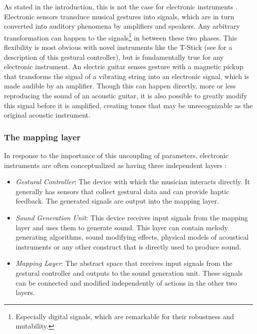 As stated in the introduction, this is not the case for electronic instruments . Electronic sensors transduce musical gestures into signals, which are in turn converted into auditory phenomena by amplifiers and speakers. Any arbitrary transformation can happen to the signals\footnote{Especially digital signals, which are remarkable for their robustness and mutability.} in between these two phases. This flexibility is most obvious with novel instruments like the T-Stick (see  for a description of this gestural controller), but is fundamentally true for any electronic instrument. An electric guitar senses gesture with a magnetic pickup that transforms the signal of a vibrating string into an electronic signal, which is made audible by an amplifier. Though this can happen directly, more or less reproducing the sound of an acoustic guitar, it is also possible to greatly modify this signal before it is amplified, creating tones that may be unrecognizable as the original acoustic instrument.

	\subsubsection{The mapping layer}

In response to the importance of this uncoupling of parameters, electronic instruments are often conceptualized as having three independent layers \cite{gestural_control_sound_synthesis}: 

	\begin{itemize}
		\item \emph{Gestural Controller}: The device with which the musician interacts directly. It generally has sensors that collect gestural data and can provide haptic feedback. The generated signals are output into the mapping layer.
		\item \emph{Sound Generation Unit}: This device receives input signals from the mapping layer and uses them to generate sound. This layer can contain melody generating algorithms, sound modifying effects, physical models of acoustical instruments or any other construct that is directly used to produce sound.
		\item \emph{Mapping Layer}: The abstract space that receives input signals from the gestural controller and outputs to the sound generation unit. These signals can be connected and modified independently of actions in the other two layers.
	\end{itemize}

